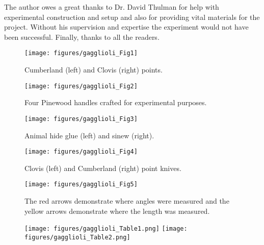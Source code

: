 \myseparator
The author owes a great thanks to Dr. David Thulman for help with experimental construction and setup and also for providing vital materials for the project. Without his supervision and expertise the experiment would not have been successful. Finally, thanks to all the readers.


\begin{figure}[!p]
	\texttt{[image: figures/gagglioli\_Fig1]}
	\centering
	\caption{Cumberland (left) and Clovis (right) points.}
	\label{fig:gagglioli_Fig1}
\end{figure}	

\begin{figure}[!p]
	\centering
	\begin{minipage}{0.45\textwidth}
		\centering
		\texttt{[image: figures/gagglioli\_Fig2]}
		\caption{Four Pinewood handles crafted for experimental purposes.}
		\label{fig:gagglioli_Fig2}
	\end{minipage}\hfill\noindent 
	\begin{minipage}{0.4\textwidth}
		\centering
		\texttt{[image: figures/gagglioli\_Fig3]}
		\caption{Animal hide glue (left) and sinew (right).}
		\label{fig:gagglioli_Fig3}
	\end{minipage}
\end{figure}

\begin{figure}[!p]
	\texttt{[image: figures/gagglioli\_Fig4]}
	\centering
	\caption{Clovis (left) and Cumberland (right) point knives.}
	\label{fig:gagglioli_Fig4}
\end{figure}

\begin{figure}[!p]
	\centering
	\texttt{[image: figures/gagglioli\_Fig5]}
	\caption{The red arrows demonstrate where angles were measured and the yellow arrows demonstrate where the length was measured.}
	\label{fig:gagglioli_Fig5}
\end{figure}

\begin{figure}[!p]
	\texttt{[image: figures/gagglioli\_Table1.png]}
	\centering
	\label{fig:Table1}
%
	\texttt{[image: figures/gagglioli\_Table2.png]}
	\centering
	\label{fig:Table2}
\end{figure}

